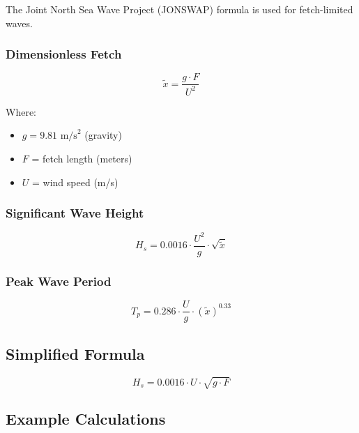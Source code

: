 \documentclass[12pt]{article}
\begin{document}
The Joint North Sea Wave Project (JONSWAP) formula is used for fetch-limited waves.

\subsubsection{Dimensionless Fetch}

\begin{equation}
\tilde{x} = \frac{g \cdot F}{U^2}
\end{equation}

Where:
\begin{itemize}
    \item $g = 9.81 \text{ m/s}^2$ (gravity)
    \item $F$ = fetch length (meters)
    \item $U$ = wind speed (m/s)
\end{itemize}

\subsubsection{Significant Wave Height}

\begin{equation}
H_s = 0.0016 \cdot \frac{U^2}{g} \cdot \sqrt{\tilde{x}}
\end{equation}

\subsubsection{Peak Wave Period}

\begin{equation}
T_p = 0.286 \cdot \frac{U}{g} \cdot (\tilde{x})^{0.33}
\end{equation}

\subsection{Simplified Formula}

\begin{equation}
\boxed{H_s = 0.0016 \cdot U \cdot \sqrt{g \cdot F}}
\end{equation}

\subsection{Example Calculations}
\end{document}
